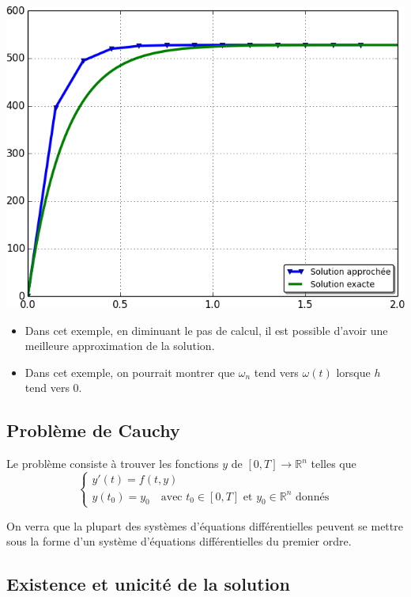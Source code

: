 \documentclass[10pt,fleqn]{article} %
\begin{document}
\begin{center}
\includegraphics[width=.6\textwidth]{images/figure_1}
\end{center}

\begin{rem}
\begin{itemize}
\item Dans cet exemple, en diminuant le pas de calcul, il est possible d'avoir une meilleure approximation de la solution. 
\item Dans cet exemple, on pourrait montrer que $\omega_n$ tend vers $\omega(t)$ lorsque $h$ tend vers 0.
\end{itemize}
\end{rem}


\subsection{Problème de Cauchy}


Le problème consiste à trouver les fonctions $y$ de $[0,T]\rightarrow \mathbb{R}^n$ telles que
$$
\left\{
\begin{array}{l}
y'(t)=f(t,y) \\
y(t_0)=y_0 \quad \text{avec } t_0\in [0,T] \text{ et } y_0\in \mathbb{R}^n \text{ donnés}
\end{array}
\right.
 $$ 


 
On verra que la plupart des systèmes d'équations différentielles peuvent se mettre sous la forme d'un système d'équations différentielles du premier ordre. 

%
%
\subsection{Existence et unicité de la solution}
\end{document}
